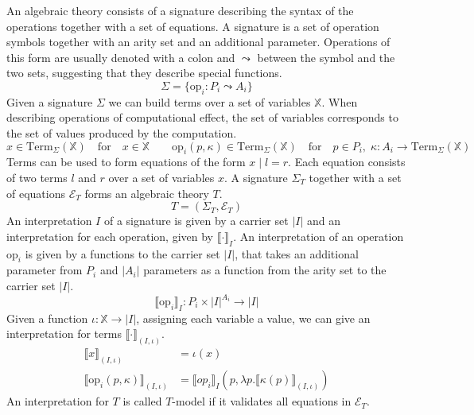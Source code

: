 An algebraic theory consists of a signature describing the syntax of the
operations together with a set of equations.
A signature is a set of operation symbols together with an arity set and an
additional parameter.
Operations of this form are usually denoted with a colon and $\leadsto$
between the symbol and the two sets, suggesting that they describe special
functions.
\[
  \Sigma = \{ \mathrm{op}_i : P_i \leadsto A_i  \}
\]
Given a signature $\Sigma$ we can build terms over a set of variables $\mathbb{X}$.
When describing operations of computational effect, the set of variables
corresponds to the set of values produced by the computation.
\[
  x \in \mathrm{Term}_\Sigma(\mathbb{X}) \quad\text{for}\quad x\in\mathbb{X} \qquad
  \mathrm{op}_i(p, \kappa) \in \mathrm{Term}_\Sigma(\mathbb{X}) \quad\text{for}\quad
  p\in P_i,\;\kappa : A_i \rightarrow \mathrm{Term}_\Sigma(\mathbb{X})
\]
Terms can be used to form equations of the form $x\;|\;l=r$.
Each equation consists of two terms $l$ and $r$ over a set of variables $x$.
A signature $\Sigma_T$ together with a set of equations $\mathcal{E}_T$ forms an
algebraic theory $T$.
\[
  T = (\Sigma_T, \mathcal{E}_T)
\]
An interpretation $I$ of a signature is given by a carrier set $|I|$ and an
interpretation for each operation, given by $\lBrack\cdot\rBrack_I$.
An interpretation of an operation $\mathrm{op}_i$ is given by a functions to the
carrier set $|I|$, that takes an additional parameter from $P_i$ and $|A_i|$
parameters as a function from the arity set to the carrier set $|I|$.
\[
  \lBrack \mathrm{op}_i \rBrack_I : P_i \times |I|^{A_i} \rightarrow |I|
\]
Given a function $\iota : \mathbb{X} \rightarrow |I|$, assigning each variable
a value, we can give an interpretation for terms $\lBrack\cdot\rBrack_{(I,\iota)}$.
\begin{align*} \lBrack x \rBrack_{(I,\iota)} &= \iota(x) \\
  \lBrack \mathrm{op}_i(p, \kappa)\rBrack_{(I,\iota)} &= \lBrack op_i \rBrack_I (p, \lambda p. \lBrack\kappa(p)\rBrack_{(I, \iota)})
\end{align*}
An interpretation for $T$ is called $T$-model if it validates all equations in $\mathcal{E}_T$.

% 

